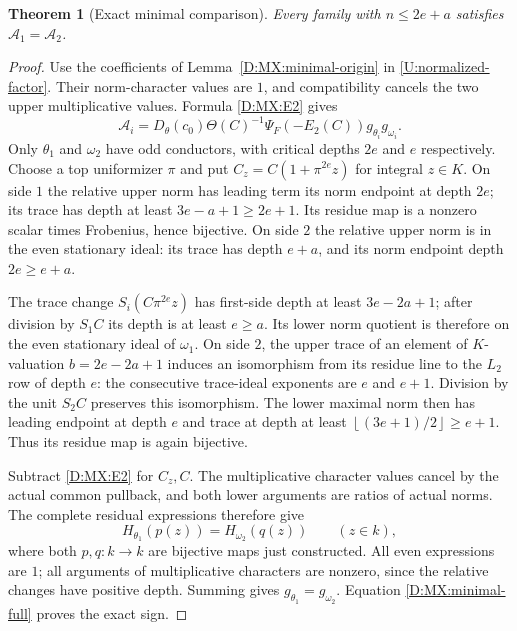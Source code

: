 \documentclass[11pt]{amsart}
\newtheorem{theorem}{Theorem}[section]
\theoremstyle{definition}
\theoremstyle{remark}
\newcommand{\floor}[1]{\left\lfloor #1\right\rfloor}
\begin{document}
\begin{theorem}[Exact minimal comparison]\label{D:MX:minimal}
Every family with $n\le2e+a$ satisfies $\mathcal A_1=\mathcal A_2$.
\end{theorem}
\begin{proof}
Use the coefficients of Lemma~\ref{D:MX:minimal-origin} in \eqref{U:normalized-factor}.
Their norm-character values are $1$, and compatibility cancels the two
upper multiplicative values. Formula \eqref{D:MX:E2} gives
\begin{equation}\label{D:MX:minimal-full}
 \mathcal A_i=D_\theta(c_0)\Theta(C)^{-1}
                    \Psi_F(-E_2(C))g_{\theta_i}g_{\omega_i}.
\end{equation}
Only $\theta_1$ and $\omega_2$ have odd conductors, with critical depths
$2e$ and $e$ respectively.
Choose a top uniformizer $\pi$ and put $C_z=C(1+\pi^{2e}z)$ for integral
$z\in K$. On side $1$ the relative upper norm has leading term its norm
endpoint at depth $2e$; its trace has depth at least $3e-a+1\ge2e+1$.
Its residue map is a nonzero scalar times Frobenius, hence bijective.
On side $2$ the relative upper norm is in the even stationary ideal:
its trace has depth $e+a$, and its norm endpoint depth $2e\ge e+a$.

The trace change $S_i(C\pi^{2e}z)$ has first-side depth at least
$3e-2a+1$; after division by $S_1C$ its depth is at least $e\ge a$.
Its lower norm quotient is therefore on the even stationary ideal of
$\omega_1$. On side $2$, the upper trace of an element of $K$-valuation
$b=2e-2a+1$ induces an isomorphism from its residue line to the
$L_2$ row of depth $e$: the consecutive trace-ideal exponents are $e$
and $e+1$. Division by the unit $S_2C$ preserves this isomorphism.
The lower maximal norm then has leading endpoint at depth $e$ and trace
at depth at least $\floor{(3e+1)/2}\ge e+1$.
Thus its residue map is again bijective.

Subtract \eqref{D:MX:E2} for $C_z,C$. The multiplicative character values
cancel by the actual common pullback, and both lower arguments are ratios
of actual norms. The complete residual expressions therefore give
\[
 H_{\theta_1}(p(z))=H_{\omega_2}(q(z))\qquad(z\in k),
\]
where both $p,q:k\to k$ are bijective maps just constructed.
All even expressions are $1$; all arguments of multiplicative characters
are nonzero, since the relative changes have positive depth.
Summing gives $g_{\theta_1}=g_{\omega_2}$. Equation \eqref{D:MX:minimal-full}
proves the exact sign.
\end{proof}
\end{document}
